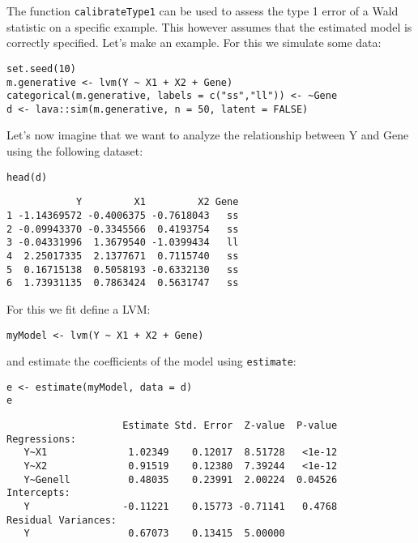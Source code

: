 \documentclass[12pt]{article}
\begin{document}
The function \texttt{calibrateType1} can be used to assess the type 1 error
of a Wald statistic on a specific example. This however assumes that
the estimated model is correctly specified. Let's make an example. For
this we simulate some data:
\lstset{language=r,label= ,caption= ,captionpos=b,numbers=none}
\begin{lstlisting}
set.seed(10)
m.generative <- lvm(Y ~ X1 + X2 + Gene)
categorical(m.generative, labels = c("ss","ll")) <- ~Gene
d <- lava::sim(m.generative, n = 50, latent = FALSE)
\end{lstlisting}

Let's now imagine that we want to analyze the relationship between
Y and Gene using the following dataset:
\lstset{language=r,label= ,caption= ,captionpos=b,numbers=none}
\begin{lstlisting}
head(d)
\end{lstlisting}

\begin{verbatim}
            Y         X1         X2 Gene
1 -1.14369572 -0.4006375 -0.7618043   ss
2 -0.09943370 -0.3345566  0.4193754   ss
3 -0.04331996  1.3679540 -1.0399434   ll
4  2.25017335  2.1377671  0.7115740   ss
5  0.16715138  0.5058193 -0.6332130   ss
6  1.73931135  0.7863424  0.5631747   ss
\end{verbatim}

For this we fit define a LVM:
\lstset{language=r,label= ,caption= ,captionpos=b,numbers=none}
\begin{lstlisting}
myModel <- lvm(Y ~ X1 + X2 + Gene)
\end{lstlisting}

and estimate the coefficients of the model using \texttt{estimate}:
\lstset{language=r,label= ,caption= ,captionpos=b,numbers=none}
\begin{lstlisting}
e <- estimate(myModel, data = d)
e
\end{lstlisting}
\begin{verbatim}
                    Estimate Std. Error  Z-value  P-value
Regressions:                                             
   Y~X1              1.02349    0.12017  8.51728   <1e-12
   Y~X2              0.91519    0.12380  7.39244   <1e-12
   Y~Genell          0.48035    0.23991  2.00224  0.04526
Intercepts:                                              
   Y                -0.11221    0.15773 -0.71141   0.4768
Residual Variances:                                      
   Y                 0.67073    0.13415  5.00000
\end{verbatim}
\end{document}
